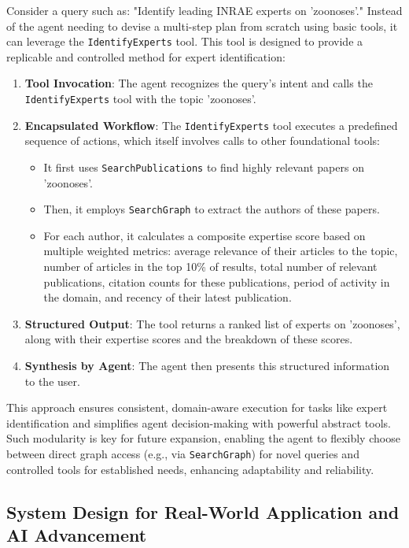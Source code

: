 \documentclass{ecai}
\begin{document}
Consider a query such as: "Identify leading INRAE experts on 'zoonoses'."
Instead of the agent needing to devise a multi-step plan from scratch using basic tools, it can leverage the \texttt{IdentifyExperts} tool. This tool is designed to provide a replicable and controlled method for expert identification:
\begin{enumerate}
    \item \textbf{Tool Invocation}: The agent recognizes the query's intent and calls the \texttt{IdentifyExperts} tool with the topic 'zoonoses'.
    \item \textbf{Encapsulated Workflow}: The \texttt{IdentifyExperts} tool executes a predefined sequence of actions, which itself involves calls to other foundational tools:
    \begin{itemize}
        \item It first uses \texttt{SearchPublications} to find highly relevant papers on 'zoonoses'.
        \item Then, it employs \texttt{SearchGraph} to extract the authors of these papers.
        \item For each author, it calculates a composite expertise score based on multiple weighted metrics: average relevance of their articles to the topic, number of articles in the top 10\% of results, total number of relevant publications, citation counts for these publications, period of activity in the domain, and recency of their latest publication.
    \end{itemize}
    \item \textbf{Structured Output}: The tool returns a ranked list of experts on 'zoonoses', along with their expertise scores and the breakdown of these scores.
    \item \textbf{Synthesis by Agent}: The agent then presents this structured information to the user.
\end{enumerate}

This approach ensures consistent, domain-aware execution for tasks like expert identification and simplifies agent decision-making with powerful abstract tools. Such modularity is key for future expansion, enabling the agent to flexibly choose between direct graph access (e.g., via \texttt{SearchGraph}) for novel queries and controlled tools for established needs, enhancing adaptability and reliability.

\subsection{System Design for Real-World Application and AI Advancement}
\end{document}
